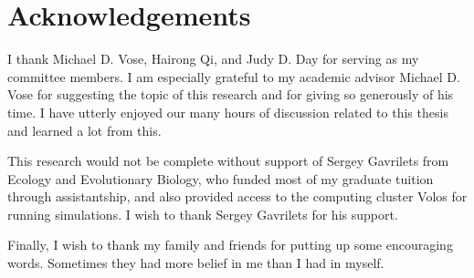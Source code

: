 \chapter*{Acknowledgements}
I thank Michael D. Vose, Hairong Qi, and Judy D. Day for serving as my committee members. 
I am especially grateful to my academic advisor Michael D. Vose for suggesting the topic of this
research and for giving so generously of his time. I have
utterly enjoyed our many hours of discussion related to this thesis 
and learned a lot from this.

This research would not be complete without support of Sergey Gavrilets 
from Ecology and Evolutionary Biology,
who funded most of my graduate tuition through assistantship, 
and also provided access to the computing cluster Volos for running simulations.
I wish to thank Sergey Gavrilets for his support. 

Finally, I wish to thank my family and friends
for putting up some encouraging words. 
Sometimes they had more belief in me than I had in myself.
